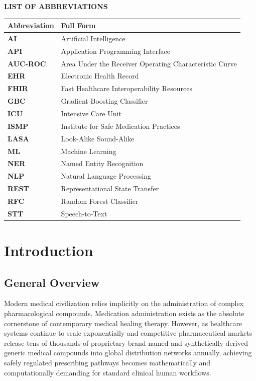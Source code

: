 \documentclass[12pt,a4paper]{report}
\begin{document}
\clearpage
\thispagestyle{plain}
\begin{center}
  {\Large\textbf{LIST OF ABBREVIATIONS}}
\end{center}
\vspace{16pt}

\begin{longtable}{>{\bfseries}p{3cm} p{10.5cm}}
\toprule
\textbf{Abbreviation} & \textbf{Full Form} \\
\midrule
\endhead
  \textbf{AI} & Artificial Intelligence\\[3pt]
  \textbf{API} & Application Programming Interface\\[3pt]
  \textbf{AUC-ROC} & Area Under the Receiver Operating Characteristic Curve\\[3pt]
  \textbf{EHR} & Electronic Health Record\\[3pt]
  \textbf{FHIR} & Fast Healthcare Interoperability Resources\\[3pt]
  \textbf{GBC} & Gradient Boosting Classifier\\[3pt]
  \textbf{ICU} & Intensive Care Unit\\[3pt]
  \textbf{ISMP} & Institute for Safe Medication Practices\\[3pt]
  \textbf{LASA} & Look-Alike Sound-Alike\\[3pt]
  \textbf{ML} & Machine Learning\\[3pt]
  \textbf{NER} & Named Entity Recognition\\[3pt]
  \textbf{NLP} & Natural Language Processing\\[3pt]
  \textbf{REST} & Representational State Transfer\\[3pt]
  \textbf{RFC} & Random Forest Classifier\\[3pt]
  \textbf{STT} & Speech-to-Text\\[3pt]
\bottomrule
\end{longtable}

\clearpage
{}
\setcounter{page}{1}


\chapter{Introduction}

\section{General Overview}
Modern medical civilization relies implicitly on the administration of complex pharmacological compounds. Medication administration exists as the absolute cornerstone of contemporary medical healing therapy. However, as healthcare systems continue to scale exponentially and competitive pharmaceutical markets release tens of thousands of proprietary brand-named and synthetically derived generic medical compounds into global distribution networks annually, achieving safely regulated prescribing pathways becomes mathematically and computationally demanding for standard clinical human workflows.
\end{document}
